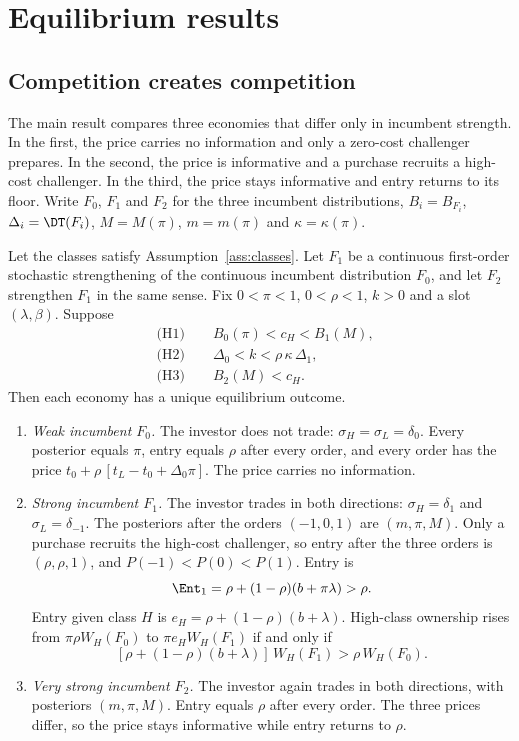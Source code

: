 \section{Equilibrium results}\label{sec:results}

\subsection{Competition creates competition}\label{sec:ccc}

The main result compares three economies that differ only in incumbent strength. In the first, the price carries
no information and only a zero-cost challenger prepares. In the second, the price is informative and a purchase
recruits a high-cost challenger. In the third, the price stays informative and entry returns to its floor. Write
\(F_0\), \(F_1\) and \(F_2\) for the three incumbent distributions, \(B_i=B_{F_i}\), \(\Delta_i=\DT(F_i)\),
\(M=M(\pi)\), \(m=m(\pi)\) and \(\kappa=\kappa(\pi)\).

\begin{proposition}\label{prop:ccc}
Let the classes satisfy Assumption~\ref{ass:classes}. Let \(F_1\) be a continuous first-order stochastic
strengthening of the continuous incumbent distribution \(F_0\), and let \(F_2\) strengthen \(F_1\) in the same sense. Fix
\(0<\pi<1\), \(0<\rho<1\), \(k>0\) and a slot \((\lambda,\beta)\). Suppose
\begin{align*}
&\text{(H1)}\qquad B_0(\pi)<c_H<B_1(M),\\
&\text{(H2)}\qquad \Delta_0<k<\rho\,\kappa\,\Delta_1,\\
&\text{(H3)}\qquad B_2(M)<c_H.
\end{align*}
Then each economy has a unique equilibrium outcome.
\begin{enumerate}[label=(\roman*),leftmargin=2em]
\item \emph{Weak incumbent \(F_0\).} The investor does not trade: \(\sigma_H=\sigma_L=\delta_0\). Every posterior
equals \(\pi\), entry equals \(\rho\) after every order, and every order has the price
\(t_0+\rho\,[t_L-t_0+\Delta_0\pi]\). The price carries no information.
\item \emph{Strong incumbent \(F_1\).} The investor trades in both directions: \(\sigma_H=\delta_1\) and
\(\sigma_L=\delta_{-1}\). The posteriors after the orders \((-1,0,1)\) are \((m,\pi,M)\). Only a purchase recruits
the high-cost challenger, so entry after the three orders is \((\rho,\rho,1)\), and \(P(-1)<P(0)<P(1)\). Entry is
\[
\Ent_1=\rho+(1-\rho)(b+\pi\lambda)>\rho.
\]
Entry given class \(H\) is \(e_H=\rho+(1-\rho)(b+\lambda)\). High-class ownership rises from \(\pi\rho W_H(F_0)\)
to \(\pi e_HW_H(F_1)\) if and only if
\[
[\rho+(1-\rho)(b+\lambda)]\,W_H(F_1)>\rho\,W_H(F_0).
\]
\item \emph{Very strong incumbent \(F_2\).} The investor again trades in both directions, with posteriors
\((m,\pi,M)\). Entry equals \(\rho\) after every order. The three prices differ, so the price stays informative
while entry returns to \(\rho\).
\end{enumerate}
\end{proposition}

